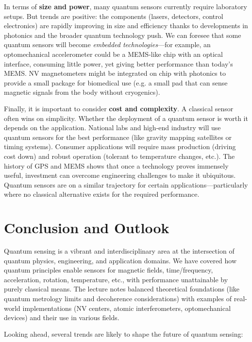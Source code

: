 In terms of \textbf{size and power}, many quantum sensors currently
require laboratory setups. But trends are positive: the components
(lasers, detectors, control electronics) are rapidly improving in size
and efficiency thanks to developments in photonics and the broader
quantum technology push. We can foresee that some quantum sensors will
become \emph{embedded technologies}—for example, an optomechanical
accelerometer could be a MEMS-like chip with an optical interface,
consuming little power, yet giving better performance than today’s
MEMS. NV magnetometers might be integrated on chip with photonics to
provide a small package for biomedical use (e.g. a small pad that can
sense magnetic signals from the body without cryogenics).



Finally, it is important to consider \textbf{cost and complexity}. A
classical sensor often wins on simplicity. Whether the deployment of a
quantum sensor is worth it depends on the application. National labs
and high-end industry will use quantum sensors for the best
performance (like gravity mapping satellites or timing
systems). Consumer applications will require mass production (driving
cost down) and robust operation (tolerant to temperature changes,
etc.). The history of GPS and MEMS shows that once a technology proves
immensely useful, investment can overcome engineering challenges to
make it ubiquitous. Quantum sensors are on a similar trajectory for
certain applications—particularly where no classical alternative
exists for the required performance.



\section{Conclusion and Outlook}

Quantum sensing is a vibrant and interdisciplinary area at the
intersection of quantum physics, engineering, and application
domains. We have covered how quantum principles enable sensors for
magnetic fields, time/frequency, acceleration, rotation, temperature,
etc., with performance unattainable by purely classical means. The
lecture notes balanced theoretical foundations (like quantum metrology
limits and decoherence considerations) with examples of real-world
implementations (NV centers, atomic interferometers, optomechanical
devices) and their use in various fields.



Looking ahead, several trends are likely to shape the future of quantum sensing:

